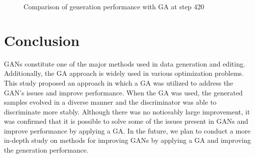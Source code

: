 \begin{figure}[t]
\centering
{}
\caption{Comparison of generation performance with GA at step 420}
\label{fig:3}
\end{figure}


\section{Conclusion}
\label{sec:conclusion}
GANs constitute one of the major methods used in data generation and editing. Additionally, the GA approach is widely used in various optimization problems. This study proposed an approach in which a GA was utilized to address the GAN’s issues and improve performance. When the GA was used, the generated samples evolved in a diverse manner and the discriminator was able to discriminate more stably. Although there was no noticeably large improvement, it was confirmed that it is possible to solve some of the issues present in GANs and improve performance by applying a GA. In the future, we plan to conduct a more in-depth study on methods for improving GANs by applying a GA and improving the generation performance.
